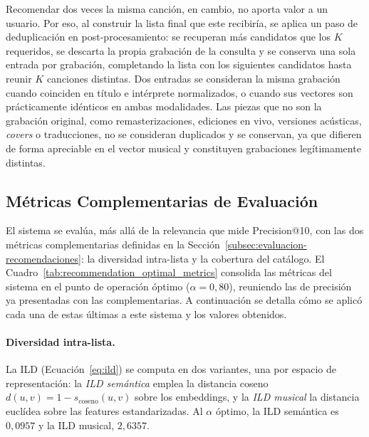 Recomendar dos veces la misma canción, en cambio, no aporta valor a un usuario. Por eso, al construir la lista final que este recibiría, se aplica un paso de deduplicación en post-procesamiento: se recuperan más candidatos que los $K$ requeridos, se descarta la propia grabación de la consulta y se conserva una sola entrada por grabación, completando la lista con los siguientes candidatos hasta reunir $K$ canciones distintas. Dos entradas se consideran la misma grabación cuando coinciden en título e intérprete normalizados, o cuando sus vectores son prácticamente idénticos en ambas modalidades. Las piezas que no son la grabación original, como remasterizaciones, ediciones en vivo, versiones acústicas, \textit{covers} o traducciones, no se consideran duplicados y se conservan, ya que difieren de forma apreciable en el vector musical y constituyen grabaciones legítimamente distintas.

\subsection{Métricas Complementarias de Evaluación}
\label{subsec:metricas-evaluacion}

El sistema se evalúa, más allá de la relevancia que mide Precision@10, con las dos métricas complementarias definidas en la Sección~\ref{subsec:evaluacion-recomendaciones}: la diversidad intra-lista y la cobertura del catálogo. El Cuadro~\ref{tab:recommendation_optimal_metrics} consolida las métricas del sistema en el punto de operación óptimo ($\alpha = 0{,}80$), reuniendo las de precisión ya presentadas con las complementarias. A continuación se detalla cómo se aplicó cada una de estas últimas a este sistema y los valores obtenidos.



\paragraph{Diversidad intra-lista.} La ILD (Ecuación~\ref{eq:ild}) se computa en dos variantes, una por espacio de representación: la \textit{ILD semántica} emplea la distancia coseno $d(u, v) = 1 - s_{\text{coseno}}(u, v)$ sobre los embeddings, y la \textit{ILD musical} la distancia euclídea sobre las features estandarizadas. Al $\alpha$ óptimo, la ILD semántica es $0{,}0957$ y la ILD musical, $2{,}6357$.

